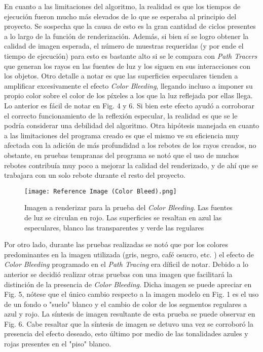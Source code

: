 \documentclass[conference]{IEEEtran}
\begin{document}
En cuanto a las limitaciones del algoritmo, la realidad es que los tiempos de ejecución fueron mucho más elevados de lo que se esperaba al principio del proyecto. Se sospecha que la causa de esto es la gran cantidad de ciclos presentes a lo largo de la función de renderización. Además, si bien sí se logro obtener la calidad de imagen esperada, el número de muestras requeridas (y por ende el tiempo de ejecución) para esto es bastante alto si se le compara con \textit{Path Tracers} que generan los rayos en las fuentes de luz y los siguen en sus interacciones con los objetos. Otro detalle a notar es que las superficies especulares tienden a amplificar excesivamente el efecto \textit{Color Bleeding}, llegando incluso a imponer su propio color sobre el color de los píxeles a los que la luz reflejada por ellas llega. Lo anterior es fácil de notar en Fig. 4 y 6. Si bien este efecto ayudó a corroborar el correcto funcionamiento de la reflexión especular, la realidad es que se le podría considerar una debilidad del algoritmo. Otra hipótesis manejada en cuanto a las limitaciones del programa creado es que el mismo ve su eficiencia muy afectada con la adición de más profundidad a los rebotes de los rayos creados, no obstante, en pruebas tempranas del programa se notó que el uso de muchos rebotes contribuía muy poco a mejorar la calidad del renderizado, y de ahí que se trabajara con un solo rebote durante el resto del proyecto. 

\begin{figure}[htbp]
\centerline{\texttt{[image: Reference Image (Color Bleed).png]}}
\caption{Imagen a renderizar para la prueba del \textit{Color Bleeding}. Las fuentes de luz se circulan en rojo. Las superficies se resaltan en azul las especulares, blanco las transparentes y verde las regulares}
\label{Imagen de referencia color bleeding}
\end{figure}

Por otro lado, durante las pruebas realizadas se notó que por los colores predominantes en la imagen utilizada (gris, negro, café osucro, etc. ) el efecto de \textit{Color Bleeding} programado en el \textit{Path Tracing} era díficil de notar. Debido a lo anterior se decidió realizar otras pruebas con una imagen que facilitará la distinción de la presencia de \textit{Color Bleeding}. Dicha imagen se puede apreciar en Fig. 5, nótese que el único cambio respecto a la imagen modelo en Fig. 1 es el uso de un fondo o "suelo" blanco y el cambio de color de los segmentos regulares a azul y rojo. La síntesis de imagen resultante de esta prueba se puede observar en Fig. 6. Cabe resaltar que la síntesis de imagen se detuvo una vez se corroboró la presencia del efecto deseado, esto último por medio de las tonalidades azules y rojas presentes en el "piso" blanco. 
\end{document}
